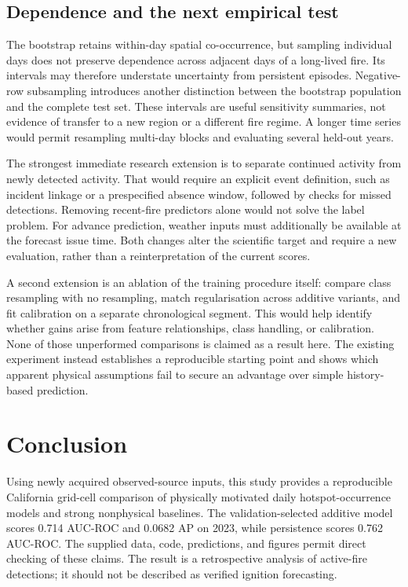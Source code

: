 \documentclass[conference]{IEEEtran}
\begin{document}
\subsection{Dependence and the next empirical test}
The bootstrap retains within-day spatial co-occurrence, but sampling individual days does not preserve dependence across adjacent days of a long-lived fire. Its intervals may therefore understate uncertainty from persistent episodes. Negative-row subsampling introduces another distinction between the bootstrap population and the complete test set. These intervals are useful sensitivity summaries, not evidence of transfer to a new region or a different fire regime. A longer time series would permit resampling multi-day blocks and evaluating several held-out years.

The strongest immediate research extension is to separate continued activity from newly detected activity. That would require an explicit event definition, such as incident linkage or a prespecified absence window, followed by checks for missed detections. Removing recent-fire predictors alone would not solve the label problem. For advance prediction, weather inputs must additionally be available at the forecast issue time. Both changes alter the scientific target and require a new evaluation, rather than a reinterpretation of the current scores.

A second extension is an ablation of the training procedure itself: compare class resampling with no resampling, match regularisation across additive variants, and fit calibration on a separate chronological segment. This would help identify whether gains arise from feature relationships, class handling, or calibration. None of those unperformed comparisons is claimed as a result here. The existing experiment instead establishes a reproducible starting point and shows which apparent physical assumptions fail to secure an advantage over simple history-based prediction.

\section{Conclusion}
Using newly acquired observed-source inputs, this study provides a reproducible California grid-cell comparison of physically motivated daily hotspot-occurrence models and strong nonphysical baselines. The validation-selected additive model scores 0.714 AUC-ROC and 0.0682 AP on 2023, while persistence scores 0.762 AUC-ROC. The supplied data, code, predictions, and figures permit direct checking of these claims. The result is a retrospective analysis of active-fire detections; it should not be described as verified ignition forecasting.
\end{document}
